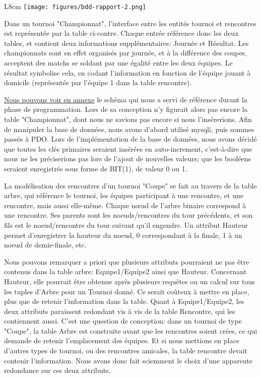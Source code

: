 \documentclass[12pt]{report}
\begin{document}
        \begin{wrapfigure}{L}{8cm}
			\texttt{[image: figures/bdd-rapport-2.png]}
		\end{wrapfigure}	    
	    
	    \par
	    Dans un tournoi "Championnat", l'interface entre les entités tournoi et rencontres est représentée par la table ci-contre. Chaque entrée référence donc les deux tables, et contient deux informations supplémentaires: Journée et Résultat. Les championnats sont en effet organisés par journée, et à la différence des coupes, acceptent des matchs se soldant par une égalité entre les deux équipes. Le résultat symbolise cela, en codant l'information en fonction de l'équipe jouant à domicile (représentée par l'équipe 1 dans la table rencontre). 
	    \bigskip
	    
	    \par
	    \hypertarget{bdd-retour-annexe}{}
	    \hyperlink{annexe-bdd-tableref}{Nous pouvons voir en annexe}
	    le schéma qui nous a servi de référence durant la phase de programmation. Lors de sa conception n'y figurait alors pas encore la table "Championnat", dont nous ne savions pas encore si nous l'insérerions. Afin de manipuler la base de données, nous avons d'abord utilisé mysqli, puis sommes passés à PDO. Lors de l'implémentation de la base de données, nous avons décidé que toutes les clés primaires seraient insérées en auto-increment, c'est-à-dire que nous ne les préciserions pas lors de l'ajout de nouvelles valeurs; que les booléens seraient enregistrés sous forme de BIT(1), de valeur 0 ou 1.
	    \par
	    La modélisation des rencontres d'un tournoi "Coupe" se fait au travers de la table arbre, qui référence le tournoi, les équipes participant à une rencontre, et une rencontre, mais aussi elle-même. Chaque nœud de l'arbre binaire correspond à une rencontre. Ses parents sont les noeuds/rencontres du tour précédents, et son fils est le noeud/rencontre du tour suivant qu'il engendre. Un attribut Hauteur permet d'enregistrer la hauteur du noeud, 0 correspondant à la finale, 1 à un noeud de demie-finale, etc. 
	    \par
	    Nous pouvons remarquer a priori que plusieurs attributs pourraient ne pas être contenus dans la table arbre: Equipe1/Equipe2 ainsi que Hauteur. 	Concernant Hauteur, elle pourrait être obtenue après plusieurs requêtes ou un calcul sur tous les tuples d'Arbre pour un Tournoi donné. Ce serait coûteux à mettre en place, plus que de retenir l'information dans la table. Quant à Equipe1/Equipe2, les deux attributs paraissent redondant vis à vis de la table Rencontre, qui les contiennent aussi. C'est une question de conception: dans un tournoi de type "Coupe", la table Arbre est construite avant que les rencontres soient crées, ce qui demande de retenir l'emplacement des équipes. Et si nous mettions en place d'autres types de tournoi, ou des rencontres amicales, la table rencontre devait contenir l'information. Nous avons donc fait sciemment le choix d'une apparente redondance sur ces deux attributs. 
        
\end{document}
